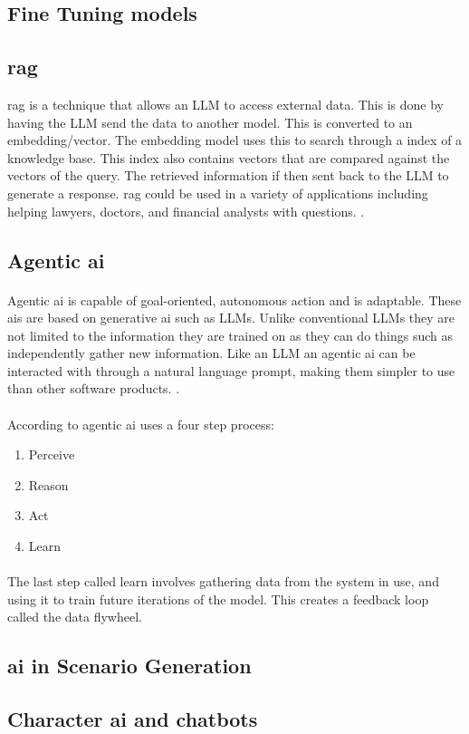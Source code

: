 \subsection{Fine Tuning models}

\subsection{\acrfull{rag}}
\acrshort{rag} is a technique that allows an LLM to access external data. This is done by having the LLM send the data to another model. This is converted to an embedding/vector. The embedding model uses this to search through a index of a knowledge base. This index also contains vectors that are compared against the vectors of the query. The retrieved information if then sent back to the LLM to generate a response. \acrshort{rag} could be used in a variety of applications including helping lawyers, doctors, and financial analysts with questions. \autocite{merritt_what_2025}.

\subsection{Agentic \acrshort{ai}}
\paragraph{}Agentic \acrshort{ai} is capable of goal-oriented, autonomous action and is adaptable. These \acrshort{ai}s are based on generative \acrshort{ai} such as LLMs. Unlike conventional LLMs they are not limited to the information they are trained on as they can do things such as independently gather new information. Like an LLM an agentic \acrshort{ai} can be interacted with through a natural language prompt, making them simpler to use than other software products. \autocite{noauthor_what_2025}.

\paragraph{}According to \textcite{pounds_what_2024} agentic \acrshort{ai} uses a four step process:
\begin{enumerate}
    \item Perceive
    \item Reason
    \item Act
    \item Learn
\end{enumerate}

\paragraph{}The last step called learn involves gathering data from the system in use, and using it to train future iterations of the model. This creates a feedback loop called the data flywheel.

\subsection{\acrshort{ai} in Scenario Generation}

\paragraph{}

\subsection{Character \acrshort{ai} and chatbots}